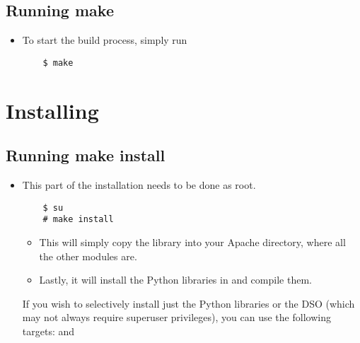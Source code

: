 \subsection{Running make\label{inst-make}}

\begin{itemize}

\item
  To start the build process, simply run
  \begin{verbatim}
    $ make
  \end{verbatim}

\end{itemize}

\section{Installing\label{inst-installing}}

\subsection{Running make install\label{inst-makeinstall}}

\begin{itemize}

\item
  This part of the installation needs to be done as root. 
  \begin{verbatim}
    $ su
    # make install
  \end{verbatim}
  
  \begin{itemize}

  \item
    This will simply copy the library into your Apache 
    directory, where all the other modules are.


  \item
    Lastly, it will install the Python libraries in  and
    compile them. 

  \end{itemize} 

   If you wish to selectively install just the Python libraries
  or the DSO (which may not always require superuser
  privileges), you can use the following  targets:
   and 

\end{itemize}

